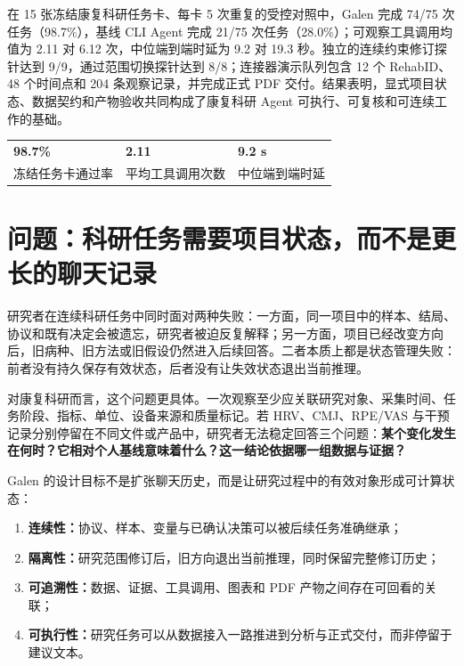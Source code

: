 \documentclass[10pt,a4paper]{article}
\newcommand{\Key}[1]{\textbf{#1}}
\newcommand{\Metric}[1]{{\fontsize{23}{25}\selectfont\bfseries #1}}
\begin{document}
在 15 张冻结康复科研任务卡、每卡 5 次重复的受控对照中，Galen 完成 74/75 次任务（98.7\%），基线 CLI Agent 完成 21/75 次任务（28.0\%）；可观察工具调用均值为 2.11 对 6.12 次，中位端到端时延为 9.2 对 19.3 秒。独立的连续约束修订探针达到 9/9，通过范围切换探针达到 8/8；连接器演示队列包含 12 个 RehabID、48 个时间点和 204 条观察记录，并完成正式 PDF 交付。结果表明，显式项目状态、数据契约和产物验收共同构成了康复科研 Agent 可执行、可复核和可连续工作的基础。

\begin{center}
\begin{tabularx}{\linewidth}{@{}YYY@{}}
\toprule
\Metric{98.7\%} & \Metric{2.11} & \Metric{9.2 s} \\
冻结任务卡通过率 & 平均工具调用次数 & 中位端到端时延 \\
\bottomrule
\end{tabularx}
\end{center}

\tableofcontents
\newpage

\section{问题：科研任务需要项目状态，而不是更长的聊天记录}
研究者在连续科研任务中同时面对两种失败：一方面，同一项目中的样本、结局、协议和既有决定会被遗忘，研究者被迫反复解释；另一方面，项目已经改变方向后，旧病种、旧方法或旧假设仍然进入后续回答。二者本质上都是状态管理失败：前者没有持久保存有效状态，后者没有让失效状态退出当前推理。

对康复科研而言，这个问题更具体。一次观察至少应关联研究对象、采集时间、任务阶段、指标、单位、设备来源和质量标记。若 HRV、CMJ、RPE/VAS 与干预记录分别停留在不同文件或产品中，研究者无法稳定回答三个问题：\Key{某个变化发生在何时？它相对个人基线意味着什么？这一结论依据哪一组数据与证据？}

Galen 的设计目标不是扩张聊天历史，而是让研究过程中的有效对象形成可计算状态：
\begin{enumerate}[leftmargin=2.1em,itemsep=3pt]
\item \Key{连续性：}协议、样本、变量与已确认决策可以被后续任务准确继承；
\item \Key{隔离性：}研究范围修订后，旧方向退出当前推理，同时保留完整修订历史；
\item \Key{可追溯性：}数据、证据、工具调用、图表和 PDF 产物之间存在可回看的关联；
\item \Key{可执行性：}研究任务可以从数据接入一路推进到分析与正式交付，而非停留于建议文本。
\end{enumerate}
\end{document}
